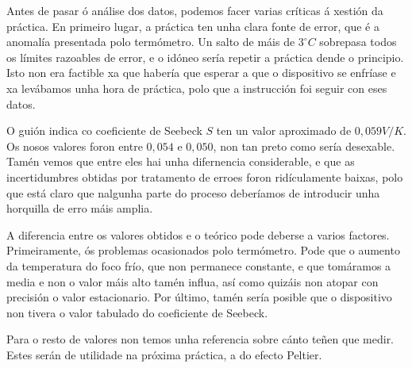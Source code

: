 \documentclass[12pt, a4paper, titlepage]{article}
\begin{document}
  Antes de pasar ó análise dos datos, podemos facer varias críticas á xestión da práctica.
  En primeiro lugar, a práctica ten unha clara fonte de error, que é a anomalía presentada polo termómetro. Un salto de máis de $3 ^{\circ} C$ sobrepasa todos os límites razoables de error, e o idóneo sería repetir a práctica dende o principio. Isto non era factible xa que habería que esperar a que o dispositivo se enfríase e xa levábamos unha hora de práctica, polo que a instrucción foi seguir con eses datos.

  O guión indica co coeficiente de Seebeck $S$ ten un valor aproximado de $0,059 V/K$. Os nosos valores foron entre $0,054$ e $0,050$, non tan preto como sería desexable. Tamén vemos que entre eles hai unha difernencia considerable, e que as incertidumbres obtidas por tratamento de erroes foron ridículamente baixas, polo que está claro que nalgunha parte do proceso deberíamos de introducir unha horquilla de erro máis amplia.

  A diferencia entre os valores obtidos e o teórico pode deberse a varios factores. Primeiramente, ós problemas ocasionados polo termómetro. Pode que o aumento da temperatura do foco frío, que non permanece constante, e que tomáramos a media e non o valor máis alto tamén influa, así como quizáis non atopar con precisión o valor estacionario. Por último, tamén sería posible que o dispositivo non tivera o valor tabulado do coeficiente de Seebeck. 

  Para o resto de valores non temos unha referencia sobre cánto teñen que medir. Estes serán de utilidade na próxima práctica, a do efecto Peltier.
\end{document}
